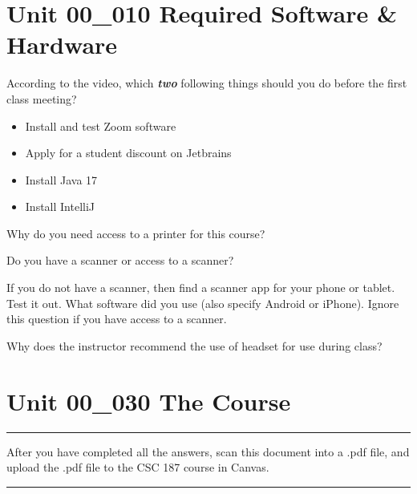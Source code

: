 \documentclass[letterpaper,12pt]{exam}
\newcommand{\unit}{Unit 00}
\begin{document}
\begin{questions}
\section*{\unit\_010 Required Software \& Hardware} %

\begin{samepage}
	\question According to the video, which \textbf{\emph{two}} following things should you do before the first class meeting?
	  \begin{itemize}
		\item Install and test Zoom software
		\vspace{5mm}
		\item Apply for a student discount on Jetbrains
		\vspace{5mm}
		\item Install Java 17
		\vspace{5mm}
		\item Install IntelliJ
		\vspace{5mm}
	   \end{itemize}
\end{samepage}

\begin{samepage}
	\question Why do you need access to a printer for this course?
	\vspace{5mm}
\end{samepage}

\begin{samepage}
	\question Do you have a scanner or access to a scanner?
	\vspace{5mm}
\end{samepage}

\begin{samepage}
	\question If you do not have a scanner, then find a scanner app for your phone or tablet.  Test it out.  What software did you use (also specify Android or iPhone).  Ignore this question if you have access to a scanner.
	\vspace{5mm}
\end{samepage}

\begin{samepage}
	\question Why does the instructor recommend the use of headset for use during class?
	\vspace{5mm}
\end{samepage}
\section*{\unit\_030 The Course} %



\end{questions}
\hrule
\vspace{5mm}
\noindent After you have completed all the answers, scan this document into a .pdf file, and upload the .pdf file to the CSC 187 course in Canvas. 
\vspace{5mm}
\hrule
\end{document}
